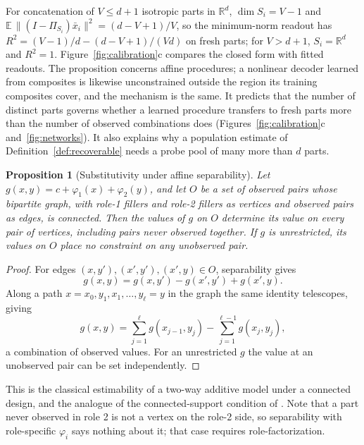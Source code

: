 \documentclass[10pt]{article}
\theoremstyle{plain}
\newtheorem{proposition}{Proposition}
\theoremstyle{remark}
\newcommand{\R}{\mathbb{R}}
\begin{document}
\noindent
For concatenation of $V \le d + 1$ isotropic parts in $\R^d$, $\dim S_i = V - 1$ and $\mathbb{E}\,\lVert(I - \Pi_{S_i})\bar{x}_i\rVert^2 = (d - V + 1)/V$, so the minimum-norm readout has $R^2 = (V-1)/d - (d - V + 1)/(Vd)$ on fresh parts; for $V > d + 1$, $S_i = \R^d$ and $R^2 = 1$. Figure~\ref{fig:calibration}c compares the closed form with fitted readouts. The proposition concerns affine procedures; a nonlinear decoder learned from composites is likewise unconstrained outside the region its training composites cover, and the mechanism is the same. It predicts that the number of distinct parts governs whether a learned procedure transfers to fresh parts more than the number of observed combinations does (Figures~\ref{fig:calibration}c and~\ref{fig:networks}). It also explains why a population estimate of Definition~\ref{def:recoverable} needs a probe pool of many more than $d$ parts.

\begin{proposition}[Substitutivity under affine separability]
\label{prop:separable}
Let $g(x, y) = c + \varphi_1(x) + \varphi_2(y)$, and let $O$ be a set of observed pairs whose bipartite graph, with role-1 fillers and role-2 fillers as vertices and observed pairs as edges, is connected. Then the values of $g$ on $O$ determine its value on every pair of vertices, including pairs never observed together. If $g$ is unrestricted, its values on $O$ place no constraint on any unobserved pair.
\end{proposition}

\begin{proof}
For edges $(x, y'), (x', y'), (x', y) \in O$, separability gives
\[
  g(x, y) = g(x, y') - g(x', y') + g(x', y).
\]
Along a path $x = x_0, y_1, x_1, \ldots, y_\ell = y$ in the graph the same identity telescopes, giving
\[
  g(x, y) = \sum_{j=1}^{\ell} g(x_{j-1}, y_j) - \sum_{j=1}^{\ell-1} g(x_j, y_j),
\]
a combination of observed values. For an unrestricted $g$ the value at an unobserved pair can be set independently.
\end{proof}

\noindent
This is the classical estimability of a two-way additive model under a connected design, and the analogue of the connected-support condition of \citet{schug2024}. Note that a part never observed in role 2 is not a vertex on the role-2 side, so separability with role-specific $\varphi_i$ says nothing about it; that case requires role-factorization.
\end{document}
